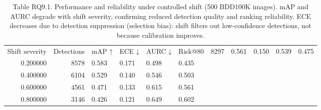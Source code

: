 \begin{table}
\caption{Table RQ9.1. Performance and reliability under controlled shift (500 BDD100K images). mAP and AURC degrade with shift severity, confirming reduced detection quality and ranking reliability. ECE decreases due to detection suppression (selection bias): shift filters out low-confidence detections, not because calibration improves.}
\label{tab:rq9_1}
\begin{tabular}{rrllll}
\toprule
Shift severity & Detections & mAP ↑ & ECE ↓ & AURC ↓ & Risk@80%
 & 8297 & 0.561 & 0.150 & 0.539 & 0.475 \\
0.200000 & 8578 & 0.583 & 0.171 & 0.498 & 0.435 \\
0.400000 & 6104 & 0.529 & 0.140 & 0.546 & 0.503 \\
0.600000 & 4561 & 0.471 & 0.133 & 0.615 & 0.561 \\
0.800000 & 3146 & 0.426 & 0.121 & 0.649 & 0.602 \\
\bottomrule
\end{tabular}
\end{table}
